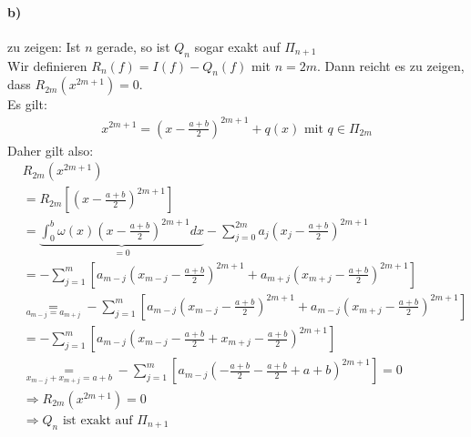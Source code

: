 \paragraph{b)} zu zeigen: Ist $n$ gerade, so ist $Q_n$ sogar exakt auf $\Pi_{n+1}$\\
\newline
Wir definieren $R_n(f)=I(f)-Q_n(f)$ mit $n=2m$. Dann reicht es zu zeigen, dass $R_{2m}(x^{2m+1})=0$.\\
Es gilt:\begin{align}
x^{2m+1}=\left(x-\frac{a+b}{2}\right)^{2m+1}+q(x) \text{ mit } q\in \Pi_{2m}
\end{align}
Daher gilt also:\begin{align*}
&R_{2m}\left(x^{2m+1}\right)\\&=R_{2m}\left[\left(x-\frac{a+b}{2}\right)^{2m+1}\right]\\
&=\underbrace{\int_0^{b}\omega (x)\left(x-\frac{a+b}{2}\right)^{2m+1}dx}_{=0}-\sum_{j=0}^{2m}a_j\left(x_j-\frac{a+b}{2}\right)^{2m+1}\\
&=-\sum_{j=1}^{m}\left[a_{m-j}\left(x_{m-j}-\frac{a+b}{2}\right)^{2m+1}+a_{m+j}\left(x_{m+j}-\frac{a+b}{2}\right)^{2m+1}\right]\\
&\underset{a_{m-j}=a_{m+j}}{=}-\sum_{j=1}^{m}\left[a_{m-j}\left(x_{m-j}-\frac{a+b}{2}\right)^{2m+1}+a_{m-j}\left(x_{m+j}-\frac{a+b}{2}\right)^{2m+1}\right]\\
&=-\sum_{j=1}^{m}\left[a_{m-j}\left(x_{m-j}-\frac{a+b}{2}+x_{m+j}-\frac{a+b}{2}\right)^{2m+1}\right]\\
&\underset{x_{m-j}+x_{m+j}=a+b}{=}-\sum_{j=1}^{m}\left[a_{m-j}\left(-\frac{a+b}{2}-\frac{a+b}{2}+a+b\right)^{2m+1}\right]=0\\
&\Rightarrow R_{2m}(x^{2m+1})=0 \\&\Rightarrow Q_n \text{ ist exakt auf } \Pi_{n+1}
\end{align*} 